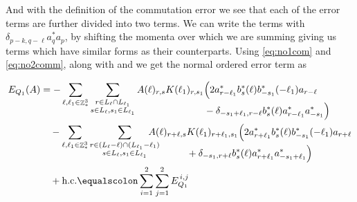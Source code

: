 \documentclass[sn-mathphys, Numbered ,a4paper]{sn-jnl}%
\DeclareMathOperator{\Z}{\mathbb{Z}}
\theoremstyle{plain}
\theoremstyle{definition}
\theoremstyle{remark}
\theoremstyle{plain}
\theoremstyle{definition}
\theoremstyle{remark}
\begin{document}
And with the definition of the commutation error we see that each of the error terms are further divided into two terms. We can write the terms with $\delta_{p-k,q-\ell}a^*_{q}a_{p}$, by shifting the momenta over which we are summing giving us terms which have similar forms as their counterparts. Using \eqref{eq:no1com} and \eqref{eq:no2comm}, along with and we get the normal ordered error term as
\begin{comment}
\begin{alignat}{2}
	E_{Q_1}(A) &= -
	\sum\limits_{\ell, \ell_1\in \Z^3_*}\sum\limits_{\substack{r\in L_{\ell} \cap L_{\ell_1}\\ s \in L_{\ell},s_1\in L_{\ell_1}}} A(\ell)_{r,s}K(\ell_1)_{r,s_1}
	\begin{aligned}[t]
		&\Big( 2a^*_{r-\ell_1}b^*_{s}(\ell) b^*_{-s_1}(-\ell_1)a_{r-\ell} \\ &+ b^*_{s}(\ell) a^*_{r-\ell_1}[b_{-s_1}(-\ell_1),a^*_{r-\ell}]^*+ \mathrm{h.c.} \Big)
	\end{aligned}\nonumber\\
	&\quad -\sum\limits_{\ell, \ell_1\in \Z^3_*}\sum\limits_{\substack{r\in (L_{\ell}-\ell) \cap (L_{\ell_1}-\ell_1)\\ s \in L_{\ell},s_1\in L_{\ell_1} }}\!\!\!\!\!\!\!\!\!\begin{aligned}[t] A(\ell)_{r+\ell,s}&K(\ell_1)_{r+\ell_1,s_1}
		\Big( 2a^*_{r+\ell_1}b^*_{s}(\ell) b^*_{-s_1}(-\ell_1) a_{r+\ell}\nonumber \\ &+ b^*_{s}(\ell) a^*_{r+\ell_1}[b_{-s_1}(-\ell_1),a^*_{r+\ell}]^*+ \mathrm{h.c.} \Big)
	\end{aligned}\\
\end{alignat}
\end{comment}
\begin{alignat}{2}
    E_{Q_1}(A) &= -
    \sum\limits_{\ell, \ell_1\in \Z^3_*}\sum\limits_{\substack{r\in L_{\ell} \cap L_{\ell_1}\\ s \in L_{\ell},s_1\in L_{\ell_1}}} A(\ell)_{r,s}K(\ell_1)_{r,s_1}
    \begin{aligned}[t]
        &\Big( 2a^*_{r-\ell_1}b^*_{s}(\ell) b^*_{-s_1}(-\ell_1)a_{r-\ell} \\ & -\delta_{-s_1+\ell_1,r-\ell} b^*_{s}(\ell) a^*_{r-\ell_1}a^*_{-s_1}\Big)
    \end{aligned}\nonumber\\
    &\quad -\sum\limits_{\ell, \ell_1\in \Z^3_*}\sum\limits_{\substack{r\in (L_{\ell}-\ell) \cap (L_{\ell_1}-\ell_1)\\ s \in L_{\ell},s_1\in L_{\ell_1} }}\!\!\!\!\!\!\!\!\!
    \begin{aligned}[t] A(\ell)_{r+\ell,s}&K(\ell_1)_{r+\ell_1,s_1}
    \Big( 2a^*_{r+\ell_1}b^*_{s}(\ell) b^*_{-s_1}(-\ell_1) a_{r+\ell}\nonumber \\ &+ \delta_{-s_1,r+\ell} b^*_{s}(\ell) a^*_{r+\ell_1}a^*_{-s_1+\ell_1}\Big)
    \end{aligned}\\
	&\quad+ \mathrm{h.c.} \equalscolon \sum\limits_{i=1}^{2}\sum\limits_{j=1}^{2} E_{Q_1}^{\,i,j}\nonumber
\end{alignat}
\end{document}
